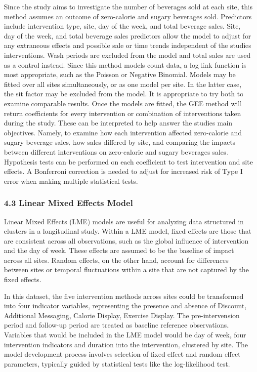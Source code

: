 \documentclass[
]{article}
\begin{document}
Since the study aims to investigate the number of beverages sold at each
site, this method assumes an outcome of zero-calorie and sugary
beverages sold. Predictors include intervention type, site, day of the
week, and total beverage sales. Site, day of the week, and total
beverage sales predictors allow the model to adjust for any extraneous
effects and possible sale or time trends independent of the studies
interventions. Wash periods are excluded from the model and total sales
are used as a control instead. Since this method models count data, a
log link function is most appropriate, such as the Poisson or Negative
Binomial. Models may be fitted over all sites simultaneously, or as one
model per site. In the latter case, the sit factor may be excluded from
the model. It is appropriate to try both to examine comparable results.
Once the models are fitted, the GEE method will return coefficients for
every intervention or combination of interventions taken during the
study. These can be interpreted to help answer the studies main
objectives. Namely, to examine how each intervention affected
zero-calorie and sugary beverage sales, how sales differed by site, and
comparing the impacts between different interventions on zero-calorie
and sugary beverages sales. Hypothesis tests can be performed on each
coefficient to test intervention and site effects. A Bonferroni
correction is needed to adjust for increased risk of Type I error when
making multiple statistical tests.

\hypertarget{linear-mixed-effects-model}{%
\subsubsection{4.3 Linear Mixed Effects
Model}\label{linear-mixed-effects-model}}

Linear Mixed Effects (LME) models are useful for analyzing data
structured in clusters in a longitudinal study. Within a LME model,
fixed effects are those that are consistent across all observations,
such as the global influence of intervention and the day of week. These
effects are assumed to be the baseline of impact across all sites.
Random effects, on the other hand, account for differences between sites
or temporal fluctuations within a site that are not captured by the
fixed effects.

In this dataset, the five intervention methods across sites could be
transformed into four indicator variables, representing the presence and
absence of Discount, Additional Messaging, Calorie Display, Exercise
Display. The pre-intervension period and follow-up period are treated as
baseline reference observations. Variables that would be included in the
LME model would be day of week, four intervention indicators and
duration into the intervention, clustered by site. The model development
process involves selection of fixed effect and random effect parameters,
typically guided by statistical tests like the log-likelihood test.
\end{document}
